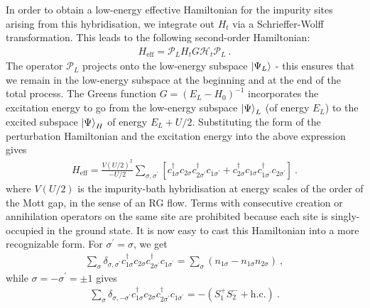 \documentclass[reprint,hidelinks,onecolumn]{revtex4-2}
\begin{document}
In order to obtain a low-energy effective Hamiltonian for the impurity sites arising from this hybridisation, we integrate out \(H_t\) via a Schrieffer-Wolff transformation. This leads to the following second-order Hamiltonian:
\begin{equation}\begin{aligned}
	H_\text{eff} = \mathcal{P}_L H_t G\mathcal H_t \mathcal{P}_L~.
\end{aligned}\end{equation}
The operator \(\mathcal{P}_L\) projects onto the low-energy subspace \(\ket{\Psi_L}\) - this ensures that we remain in the low-energy subspace at the beginning and at the end of the total process. The Greens function \(G = (E_L - H_0)^{-1}\) incorporates the excitation energy to go from the low-energy subspace \(\ket{\Psi}_L\) (of energy \(E_L\)) to the excited subspace \(\ket{\Psi}_H\) of energy \(E_L + U/2\). Substituting the form of the perturbation Hamiltonian and the excitation energy into the above expression gives
\begin{equation}\begin{aligned}\label{effHam1}
	H_\text{eff} = \frac{V(U/2)^2}{-U/2}\sum_{\sigma,\sigma^\prime} \left[c^\dagger_{1\sigma}c_{2\sigma}c^\dagger_{2\sigma^\prime}c_{1\sigma^\prime} + c^\dagger_{2\sigma}c_{1\sigma}c^\dagger_{1\sigma^\prime}c_{2\sigma^\prime}\right] ~.
\end{aligned}\end{equation}
where \(V(U/2)\) is the impurity-bath hybridisation at energy scales of the order of the Mott gap, in the sense of an RG flow. Terms with consecutive creation or annihilation operators on the same site are prohibited because each site is singly-occupied in the ground state. It is now easy to cast this Hamiltonian into a more recognizable form. For \(\sigma^\prime=\sigma\), we get
\begin{equation}\begin{aligned}
	\sum_{\sigma}\delta_{\sigma,\sigma^\prime}c^\dagger_{1\sigma}c_{2\sigma}c^\dagger_{2\sigma^\prime}c_{1\sigma^\prime} = \sum_\sigma \left(n_{1\sigma} - n_{1\sigma}n_{2\sigma}\right) ~,
\end{aligned}\end{equation}
while \(\sigma=-\sigma^\prime=\pm 1\) gives 
\begin{equation}\begin{aligned}
	\sum_{\sigma}\delta_{\sigma,-\sigma^\prime}c^\dagger_{1\sigma}c_{2\sigma}c^\dagger_{2\sigma^\prime}c_{1\sigma^\prime} = -\left(S_1^+ S_2^- + \text{h.c.}\right)~.
\end{aligned}\end{equation}
\end{document}
